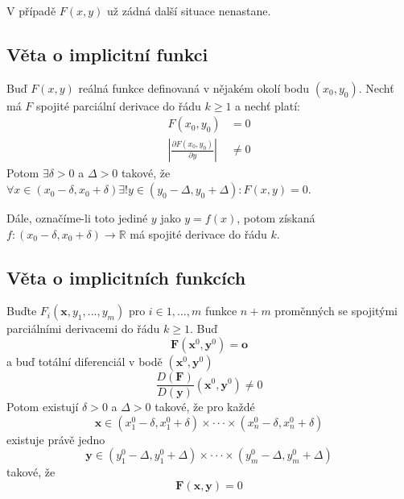 \documentclass[../main.tex]{subfiles}
\begin{document}
\noindent
\hspace{1.2mm}
V případě $F(x,y)$ už zádná další situace nenastane.

\subsection{Věta o implicitní funkci}
\hspace{1.2mm}
\noindent
Buď $F(x,y)$ reálná funkce definovaná v nějakém okolí bodu $(x_0, y_0)$. Nechť má $F$ spojité parciální
derivace do řádu $k \geq 1$ a nechť platí:
\begin{align*}
    F(x_0, y_0) &= 0\\
    \left| \frac{\partial F(x_0,y_0)}{\partial y} \right| &\neq 0
\end{align*}
Potom $ \exists \delta > 0$ a $\Delta > 0$ takové, že
$\forall x \in (x_0 - \delta , x_0 + \delta) \exists! y \in (y_0 - \Delta , y_0 + \Delta): F(x,y) = 0$.

\noindent
Dále, označíme-li toto jediné $y$ jako $y = f(x)$, potom získaná
$f: (x_0 - \delta , x_0 + \delta ) \to \mathbb{R}$ má spojité derivace do řádu $k$.


\subsection{Věta o implicitních funkcích}
\hspace{1.2mm}
\noindent
Buďte $F_i(\mathbf{x}, y_1, ... , y_m)$ pro $i \in {1, ... , m}$ funkce $n+m$ proměnných se spojitými
parciálními derivacemi do řádu $k \geq 1$. Buď \[ \mathbf{F}(\mathbf{x}^0, \mathbf{y}^0) = \mathbf{o} \]
a buď totální diferenciál v bodě $(\mathbf{x}^0, \mathbf{y}^0)$ \[ \frac{D(\mathbf{F})}{D(\mathbf{y})}(\mathbf{x}^0, \mathbf{y}^0) \neq 0 \]
Potom existují $\delta > 0$ a $\Delta > 0$ takové, že pro každé
\[ \mathbf{x} \in (x_{1}^{0} - \delta, x_{1}^{0} + \delta) \times \cdot \cdot \cdot \times 
(x_{n}^{0} - \delta, x_{n}^{0} + \delta)\]
existuje právě jedno
\[ \mathbf{y} \in (y_{1}^{0} - \Delta , y_{1}^{0} + \Delta) \times \cdot \cdot \cdot \times
(y_{m}^{0} - \Delta , y_{m}^{0} + \Delta) \]
takové, že
\[ \mathbf{F}(\mathbf{x}, \mathbf{y}) = 0 \]
\end{document}
